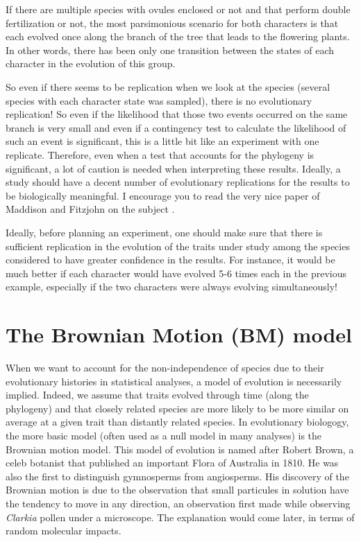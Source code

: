 \documentclass[
]{book}
\begin{document}
If there are multiple species with ovules enclosed or not and that perform double fertilization or not, the most parsimonious scenario for both characters is that each evolved once along the branch of the tree that leads to the flowering plants. In other words, there has been only one transition between the states of each character in the evolution of this group.

So even if there seems to be replication when we look at the species (several species with each character state was sampled), there is no evolutionary replication! So even if the likelihood that those two events occurred on the same branch is very small and even if a contingency test to calculate the likelihood of such an event is significant, this is a little bit like an experiment with one replicate. Therefore, even when a test that accounts for the phylogeny is significant, a lot of caution is needed when interpreting these results. Ideally, a study should have a decent number of evolutionary replications for the results to be biologically meaningful. I encourage you to read the very nice paper of Maddison and Fitzjohn on the subject \citep{maddison2015unsolved}.

Ideally, before planning an experiment, one should make sure that there is sufficient replication in the evolution of the traits under study among the species considered to have greater confidence in the results. For instance, it would be much better if each character would have evolved 5-6 times each in the previous example, especially if the two characters were always evolving simultaneously!

\chapter{The Brownian Motion (BM) model}\label{BM-model}

When we want to account for the non-independence of species due to their evolutionary histories in statistical analyses, a model of evolution is necessarily implied. Indeed, we assume that traits evolved through time (along the phylogeny) and that closely related species are more likely to be more similar on average at a given trait than distantly related species. In evolutionary biologogy, the more basic model (often used as a null model in many analyses) is the Brownian motion model. This model of evolution is named after Robert Brown, a celeb botanist that published an important Flora of Australia in 1810. He was also the first to distinguish gymnosperms from angiosperms. His discovery of the Brownian motion is due to the observation that small particules in solution have the tendency to move in any direction, an observation first made while observing \emph{Clarkia} pollen under a microscope. The explanation would come later, in terms of random molecular impacts.
\end{document}
